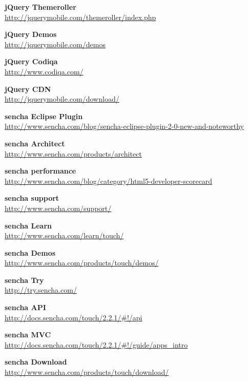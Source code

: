 \documentclass[a4paper,12pt]{book}
\begin{document}
\begin{thebibliography}{25}
\textbf{jQuery Themeroller}\\
{\footnotesize\url{http://jquerymobile.com/themeroller/index.php}}

\textbf{jQuery Demos}\\
{\footnotesize\url{http://jquerymobile.com/demos}}

\textbf{jQuery Codiqa}\\
{\footnotesize\url{http://www.codiqa.com/}}

\textbf{jQuery CDN}\\
{\footnotesize\url{http://jquerymobile.com/download/}}

\textbf{sencha Eclipse Plugin}\\
{\footnotesize\url{http://www.sencha.com/blog/sencha-eclipse-plugin-2-0-new-and-noteworthy}}

\textbf{sencha Architect}\\
{\footnotesize\url{http://www.sencha.com/products/architect}}

\textbf{sencha performance}\\
{\footnotesize\url{http://www.sencha.com/blog/category/html5-developer-scorecard}}

\textbf{sencha support}\\
{\footnotesize\url{http://www.sencha.com/support/}}

\textbf{sencha Learn}\\
{\footnotesize\url{http://www.sencha.com/learn/touch/}}

\textbf{sencha Demos}\\
{\footnotesize\url{http://www.sencha.com/products/touch/demos/}}

\textbf{sencha Try}\\
{\footnotesize\url{http://try.sencha.com/}}

\textbf{sencha API}\\
{\footnotesize\url{http://docs.sencha.com/touch/2.2.1/#!/api}}

\textbf{sencha MVC}\\
{\footnotesize\url{http://docs.sencha.com/touch/2.2.1/#!/guide/apps_intro}}

\textbf{sencha Download}\\
{\footnotesize\url{http://www.sencha.com/products/touch/download/}}


\end{thebibliography}
\end{document}
